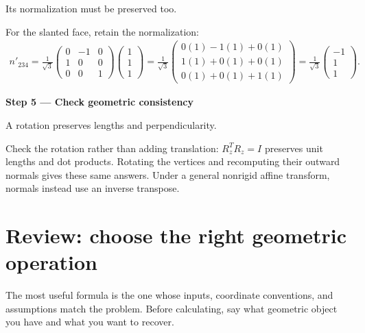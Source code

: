 \documentclass[letterpaper,11pt,english,openany,oneside]{jupyterBook}
\begin{document}
\sphinxAtStartPar
{} Its normalization must be preserved too.

\sphinxAtStartPar
For the slanted face, retain the normalization:
{\color{QuizMathBlue} \begin{equation*}
\begin{split}
n'_{234}=\frac1{\sqrt3}\begin{pmatrix}0&-1&0\\1&0&0\\0&0&1\end{pmatrix}
\begin{pmatrix}1\\1\\1\end{pmatrix}
=\frac1{\sqrt3}\begin{pmatrix}0(1)-1(1)+0(1)\\1(1)+0(1)+0(1)\\0(1)+0(1)+1(1)\end{pmatrix}
=\frac1{\sqrt3}\begin{pmatrix}-1\\1\\1\end{pmatrix}.
\end{split}
\end{equation*}}
\par

\par\medskip{}
{\color{QuizStepRed}\bfseries Step 5 — Check geometric consistency}\par\smallskip

\sphinxAtStartPar
{} A rotation preserves lengths and perpendicularity.

\sphinxAtStartPar
Check the rotation rather than adding translation: {\color{QuizMathBlue} \(R_z^TR_z=I\)} preserves unit lengths and dot products. Rotating the vertices and recomputing their outward normals gives these same answers. Under a general nonrigid affine transform, normals instead use an inverse transpose.

\par

\sphinxstepscope


\section{Review: choose the right geometric operation}
\label{\detokenize{lectures/lecture01/review:review-choose-the-right-geometric-operation}}\label{\detokenize{lectures/lecture01/review:lec01-review}}\label{\detokenize{lectures/lecture01/review::doc}}
\sphinxAtStartPar
The most useful formula is the one whose inputs, coordinate conventions, and assumptions match the problem. Before calculating, say what geometric object you have and what you want to recover.
\end{document}
